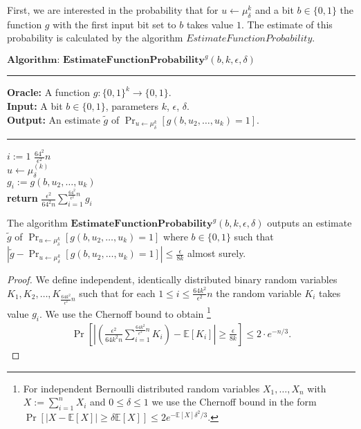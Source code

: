 First, we are interested in the probability that for $u \leftarrow \mu_{\delta}^k$ and a bit $b \in \{0,1\}$ the function $g$
with the first input bit set to $b$ takes value $1$. The estimate of this probability is calculated by the algorithm
$EstimateFunctionProbability$.
%
\begin{codeblock}
  $\textbf{Algorithm: EstimateFunctionProbability}^{g}(b, k, \epsilon, \delta)$
  \medskip
  \hrule
  \medskip
  \textbf{Oracle:} A function $g : \{0,1\}^{k} \rightarrow \{0,1\}$.\\
  \textbf{Input:} A bit $b \in \{0,1\}$, parameters $k$, $\epsilon$, $\delta$. \\
  \textbf{Output:} An estimate $\widetilde{g}$ of $\Pr_{u \leftarrow \mu_{\delta}^{k}}[g(b,u_2, \dots, u_k) = 1]$.
  \medskip\hrule\medskip
  \For $i:=1$ \To $\frac{64^2}{\epsilon^2} n$ \Do \\
  \IndI $u \leftarrow \mu_{\delta}^{(k)}$ \\
  \IndI $g_i := g(b, u_2, \dots, u_k)$ \\
  \textbf{return} $\frac{\epsilon^2}{64^2n} \sum_{i=1}^{\frac{64^2}{\epsilon^2} n} g_i$
\end{codeblock}
%
\begin{lemma}
  \label{lemma:estimate_of_g}
  The algorithm $\textbf{EstimateFunctionProbability}^{g}(b, k, \epsilon, \delta)$ outputs an estimate $\widetilde{g}$
  of $\Pr_{u \leftarrow \mu_{\delta}^k}[g(b, u_2, \dots, u_k) = 1]$ where $b \in \{0,1\}$
  such that $| \widetilde{g} - \Pr_{u \leftarrow \mu_{\delta}^{k}}\left[g(b,u_2, \dots, u_k) = 1\right] | \leq \frac{\epsilon}{8k}$ almost surely.
\end{lemma}
%
\begin{proof}
We define independent, identically distributed binary random variables $K_1, K_2, \dots, K_{\frac{64k^2}{\epsilon^2} n}$
such that for each $1 \leq i \leq \frac{64k^2}{\epsilon^2} n$
the random variable $K_i$ takes value $g_i$. We use the Chernoff bound to obtain
\footnote{For independent Bernoulli distributed random variables $X_1, \dots, X_n$ with $X := \sum_{i=1}^n X_i$ and $0 \leq \delta \leq 1$
  we use the Chernoff bound in the form $\Pr[|X - \mathbb{E}[X]| \geq \delta \mathbb{E}[X]] \leq 2 e^{- \mathbb{E}[X] \delta^2 / 3}$.}
\begin{align*}
  \Pr \left[\left|\left(\frac{\epsilon^2}{64k^2n} \sum_{i=1}^{\frac{64k^2}{\epsilon^2}n } K_i \right) - \mathbb{E}[K_i]\right|
    \geq \frac{\epsilon}{8k} \right] \leq 2 \cdot e^{-n/3}.
\end{align*}
\end{proof}
